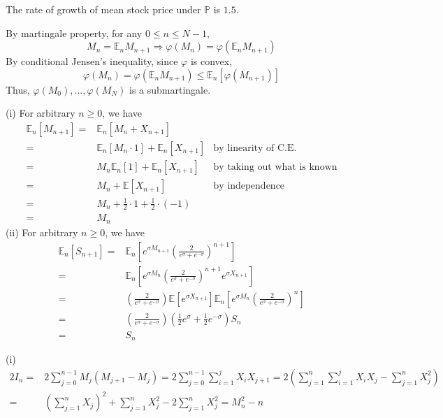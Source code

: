 \documentclass[12pt]{article}
\newenvironment{exercise}[2][Exercise]{\begin{trivlist}
		\item[\hskip \labelsep {\bfseries #1}\hskip \labelsep {\bfseries #2.}]}{\end{trivlist}}
\begin{document}
	The rate of growth of mean stock price under $\mathbb{P}$ is $1.5$. \\
	\begin{exercise}{3}\end{exercise}
	By martingale property, for any $0\le n\le N-1$, 
	$$M_n = \mathbb{E}_nM_{n+1} \Rightarrow \varphi(M_n) = \varphi(\mathbb{E}_nM_{n+1})$$
	By conditional Jensen's inequality, since $\varphi$ is convex,
	$$\varphi(M_n) = \varphi(\mathbb{E}_n M_{n+1})\le \mathbb{E}_n[\varphi(M_{n+1})]$$
	Thus, $\varphi(M_0),...,\varphi(M_N)$ is a submartingale. 
	\begin{exercise}{4}\end{exercise}
	(i) For arbitrary $n\ge 0$, we have
	\begin{align*}
	\mathbb{E}_n[M_{n+1}] =& \mathbb{E}_n[M_n + X_{n+1}] & \\
	=&\mathbb{E}_n[M_n\cdot 1] + \mathbb{E}_n[X_{n+1}] &\text{by linearity of C.E.}\\
	=&M_n\mathbb{E}_n[1] + \mathbb{E}_n[X_{n+1}] &\text{by taking out what is known}\\
	=&M_n + \mathbb{E}[X_{n+1}] &\text{by independence}\\
	=&M_n + \frac{1}{2}\cdot 1+\frac{1}{2}\cdot (-1)  &\\
	=&M_n & 
	\end{align*}
	(ii) For arbitrary $n\ge 0$, we have
	\begin{align*}
	\mathbb{E}_n[S_{n+1}] =& \mathbb{E}_n\left[e^{\sigma M_{n+1}}\left(\frac{2}{e^\sigma+e^{-\sigma}}\right)^{n+1}\right]\\
	=&\mathbb{E}_n\left[e^{\sigma M_n}\left(\frac{2}{e^\sigma+e^{-\sigma}}\right)^{n+1}e^{\sigma X_{n+1}}\right]\\
	=&\left(\frac{2}{e^\sigma+e^{-\sigma}}\right)\mathbb{E}\left[e^{\sigma X_{n+1}}\right] \mathbb{E}_n\left[e^{\sigma M_n}\left(\frac{2}{e^\sigma+e^{-\sigma}}\right)^n\right]\\
	=&\left(\frac{2}{e^\sigma+e^{-\sigma}}\right)\left(\frac{1}{2}e^\sigma+\frac{1}{2}e^{-\sigma}\right)S_n\\
	=&S_n
	\end{align*}
	\begin{exercise}{5}\end{exercise}
	(i) \begin{align*}
	2I_n=&2\sum_{j=0}^{n-1}M_j(M_{j+1}-M_j)=2\sum_{j=0}^{n-1} \sum_{i=1}^j X_iX_{j+1}
	=2\left(\sum_{j=1}^{n} \sum_{i=1}^{j} X_iX_{j}-\sum_{j=1}^n X_j^2\right)\\
	=&\left(\sum_{j=1}^nX_j\right)^2+\sum_{j=1}^nX_j^2 - 2\sum_{j=1}^nX_j^2 = M_n^2 - n
	\end{align*}
\end{document}
